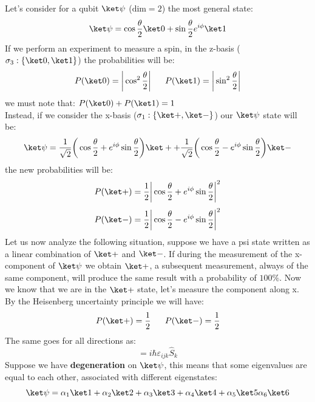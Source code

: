 \noindent Let's consider for a qubit $\ket \psi$ ($\text{dim} = 2$) the most general state:
\begin{equation*}
    \ket \psi = \cos \frac{\theta}{2}\ket 0+\sin \frac{\theta}{2}e^{i\phi}\ket 1
\end{equation*}
\noindent If we perform an experiment to measure a spin, in the z-basis ($\sigma_3: \{\ket 0, \ket 1\}$) the probabilities will be:
\begin{equation*}
    P(\ket 0) = \bigg|\cos^2\frac{\theta}{2}\bigg| \ \ \ \ \ P(\ket 1) = \bigg|\sin^2\frac{\theta}{2}\bigg|
\end{equation*}
\noindent we must note that: $P(\ket 0)+P(\ket 1)=1$\\
Instead, if we consider the x-basis ($\sigma_1: \{\ket +, \ket -\}$) our $\ket \psi$ state will be:
\begin{equation*}
    \ket \psi = \frac{1}{\sqrt 2}\bigg(\cos\frac{\theta}{2}+e^{i\phi}\sin\frac{\theta}{2}\bigg)\ket + + \frac{1}{\sqrt 2}\bigg(\cos\frac{\theta}{2}-e^{i\phi}\sin\frac{\theta}{2}\bigg)\ket -
\end{equation*}
\noindent the new probabilities will be:
\begin{equation*}
    P(\ket +)=\frac 12 \bigg|\cos\frac{\theta}{2}+e^{i\phi}\sin\frac{\theta}{2}\bigg|^2
\end{equation*}
\begin{equation*}
    P(\ket -)=\frac 12 \bigg|\cos\frac{\theta}{2}-e^{i\phi}\sin\frac{\theta}{2}\bigg|^2
\end{equation*}
\noindent Let us now analyze the following situation, suppose we have a psi state written as a linear combination of $\ket+$ and $\ket-$. If during the measurement of the x-component of $\ket \psi$ we obtain $\ket+$, a subsequent measurement, always of the same component, will produce the same result with a probability of $100\%$. Now we know that we are in the $\ket+$ state, let's measure the component along x. By the Heisenberg uncertainty principle we will have:
\begin{equation*}
    P(\ket+)=\frac 12 \ \ \ \ \ P(\ket-)=\frac 12
\end{equation*}
\noindent The same goes for all directions as: 
\begin{equation*}
    [\hat S_i, \hat S_j]=i\hbar\varepsilon_{ijk}\hat S_k
\end{equation*}
\noindent Suppose we have \textbf{degeneration} on $\ket\psi$, this means that some eigenvalues are equal to each other, associated with different eigenstates: 
\begin{equation*}
    \ket \psi = \alpha_1\ket1+\alpha_2\ket2+\alpha_3\ket3+\alpha_4\ket4+\alpha_5\ket5\alpha_6\ket6
\end{equation*}

